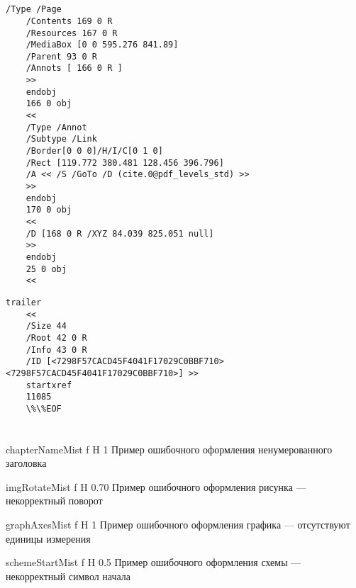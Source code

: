 \begin{appendices}


	\chapter{}
\begin{lstlisting}[label=lst:body,caption=Пример части тела PDF файла]
	/Type /Page
	/Contents 169 0 R
	/Resources 167 0 R
	/MediaBox [0 0 595.276 841.89]
	/Parent 93 0 R
	/Annots [ 166 0 R ]
	>>
	endobj
	166 0 obj
	<<
	/Type /Annot
	/Subtype /Link
	/Border[0 0 0]/H/I/C[0 1 0]
	/Rect [119.772 380.481 128.456 396.796]
	/A << /S /GoTo /D (cite.0@pdf_levels_std) >>
	>>
	endobj
	170 0 obj
	<<
	/D [168 0 R /XYZ 84.039 825.051 null]
	>>
	endobj
	25 0 obj
	<<
\end{lstlisting}

\begin{lstlisting}[label=lst:tail,caption=Пример <<хвоста>> PDF файла]
	trailer
	<< 
	/Size 44
	/Root 42 0 R
	/Info 43 0 R
	/ID [<7298F57CACD45F4041F17029C0BBF710> <7298F57CACD45F4041F17029C0BBF710>] >>
	startxref
	11085
	\%\%EOF
\end{lstlisting}





\chapter{}
{chapterNameMist} %
{f} %
{H} %
{1\textwidth} %
{Пример ошибочного оформления ненумерованного заголовка} %

{imgRotateMist} %
{f} %
{H} %
{0.70\textwidth} %
{Пример ошибочного оформления рисунка --- некорректный поворот} %

{graphAxesMist} %
{f} %
{H} %
{1\textwidth} %
{Пример ошибочного оформления графика --- отсутствуют единицы измерения} %

{schemeStartMist} %
{f} %
{H} %
{0.5\textwidth} %
{Пример ошибочного оформления схемы --- некорректный символ начала} %


\end{appendices}

